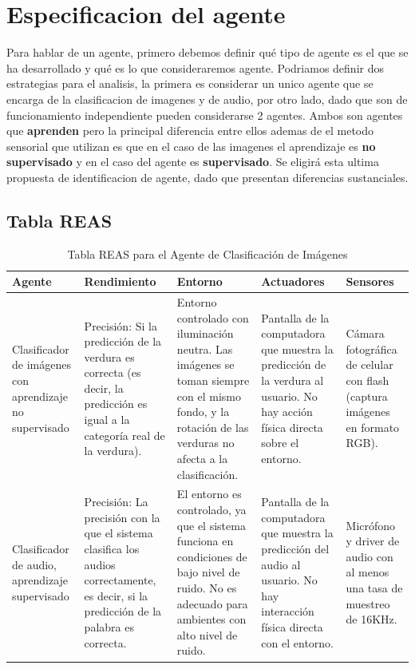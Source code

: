 \documentclass[12pt,a4paper]{article}
\begin{document}
\section{Especificacion del agente}\label{sec2}
Para hablar de un agente, primero debemos definir qué tipo de agente es el que se ha desarrollado y qué es lo que consideraremos agente. Podriamos definir dos estrategias para el analisis, la primera es considerar un unico agente que se encarga de la clasificacion de imagenes y de audio, por otro lado, dado que son de funcionamiento independiente pueden considerarse 2 agentes. 
Ambos son agentes que \textbf{aprenden} pero la principal diferencia entre ellos ademas de el metodo sensorial que utilizan es que en el caso de las imagenes el aprendizaje es \textbf{no supervisado} y en el caso del agente es \textbf{supervisado}. 
Se eligirá esta ultima propuesta de identificacion de agente, dado que presentan diferencias sustanciales.
\subsection{Tabla REAS}

\begin{table}[ht]
\centering
\small
\begin{tabular}{|p{2.2cm}|p{3cm}|p{3cm}|p{3cm}|p{2.5cm}|}
\hline
 \textbf{Agente} & \textbf{Rendimiento} & \textbf{Entorno} & \textbf{Actuadores} & \textbf{Sensores} \\
\hline
Clasificador de imágenes con aprendizaje no supervisado & Precisión: Si la predicción de la verdura es correcta (es decir, la predicción es igual a la categoría real de la verdura). & Entorno controlado con iluminación neutra. Las imágenes se toman siempre con el mismo fondo, y la rotación de las verduras no afecta a la clasificación. & Pantalla de la computadora que muestra la predicción de la verdura al usuario. No hay acción física directa sobre el entorno. & Cámara fotográfica de celular con flash (captura imágenes en formato RGB). \\
\hline
Clasificador de audio, aprendizaje supervisado & Precisión: La precisión con la que el sistema clasifica los audios correctamente, es decir, si la predicción de la palabra es correcta. & El entorno es controlado, ya que el sistema funciona en condiciones de bajo nivel de ruido. No es adecuado para ambientes con alto nivel de ruido. & Pantalla de la computadora que muestra la predicción del audio al usuario. No hay interacción física directa con el entorno. & Micrófono y driver de audio con al menos una tasa de muestreo de 16KHz.\\
\hline
\end{tabular}
\caption{Tabla REAS para el Agente de Clasificación de Imágenes}
\end{table}
\end{document}
